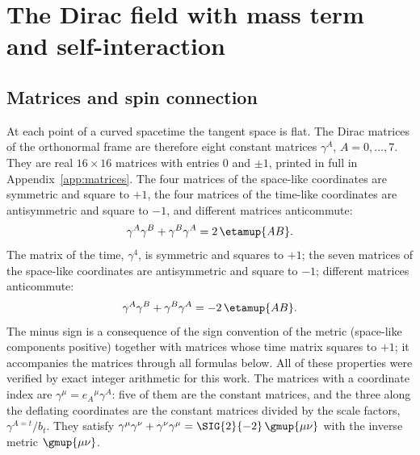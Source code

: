 \section{The Dirac field with mass term and self-interaction}
\label{sec:dirac}

\subsection{Matrices and spin connection}

At each point of a curved spacetime the tangent space is flat. The Dirac matrices of the orthonormal
frame are therefore eight constant matrices $\gamma^{A}$, $A=0,\dots,7$. They are real $16\times16$
matrices with entries $0$ and $\pm1$, printed in full in Appendix~\ref{app:matrices}.
The four matrices of the space-like coordinates are symmetric and square to $+1$, the four matrices
of the time-like coordinates are antisymmetric and square to $-1$, and different matrices
anticommute:
\begin{equation}
\gamma^{A}\gamma^{B}+\gamma^{B}\gamma^{A}=2\,\etamup{AB} .
\label{eq:clifford}
\end{equation}
The matrix of the time, $\gamma^{4}$, is symmetric and squares to $+1$; the seven matrices of the
space-like coordinates are antisymmetric and square to $-1$; different matrices anticommute:
\begin{equation}
\gamma^{A}\gamma^{B}+\gamma^{B}\gamma^{A}=-2\,\etamup{AB} .
\label{eq:clifford}
\end{equation}
The minus sign is a consequence of the sign convention of the metric (space-like components
positive) together with matrices whose time matrix squares to $+1$; it accompanies the matrices
through all formulas below.
All of these properties were verified by exact integer arithmetic for this work. The matrices with a
coordinate index are $\gamma^{\mu}=e_A{}^{\mu}\gamma^{A}$: five of them are the constant matrices,
and the three along the deflating coordinates are the constant matrices divided by the scale
factors, $\gamma^{A=t}/b_t$. They satisfy
$\gamma^{\mu}\gamma^{\nu}+\gamma^{\nu}\gamma^{\mu}=\SIG{2}{-2}\,\gmup{\mu\nu}$ with the inverse
metric $\gmup{\mu\nu}$.

